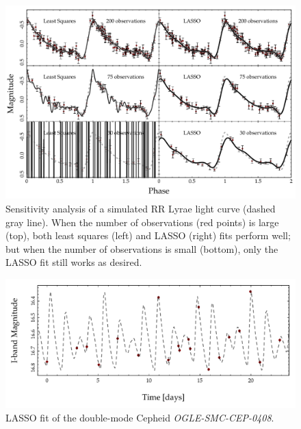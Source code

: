 \documentclass[11pt,twoside]{book}
\begin{document}
\begin{figure}
    \centering
    \includegraphics[width=\textwidth,keepaspectratio]{sensitivity.pdf}
    \caption{Sensitivity analysis of a simulated RR Lyrae light curve (dashed gray line). When the number of observations (red points) is large (top), both least squares (left) and LASSO (right) fits perform well; but when the number of observations is small (bottom), only the LASSO fit still works as desired.} 
    \label{fig:sensitivity} 
\end{figure}

\begin{figure}
    \centering
    \includegraphics[width=\textwidth,keepaspectratio]{OGLE-SMC-CEP-0408.pdf}
    \caption{LASSO fit of the double-mode Cepheid \emph{OGLE-SMC-CEP-0408}.}
    \label{fig:multimode} 
\end{figure}
\end{document}
